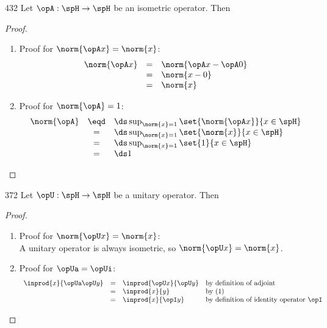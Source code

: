 \begin{theorem}
\citep{michel}{432}
Let $\opA:\spH\to\spH$ be an isometric operator. Then
\end{theorem}
\begin{proof}
\begin{enumerate}
\item Proof for $\norm{\opA x} = \norm{x}$:
\[\begin{array}{rcll}
  \norm{\opA x}
    &=& \norm{\opA x - \opA 0}
  \\&=& \norm{x - 0}
  \\&=& \norm{x}
\end{array}\]

\item Proof for $\norm{\opA} = 1$:
\[\begin{array}{rcll}
  \norm{\opA}
    &\eqd& \ds \sup_{\norm{x}=1}\set{\norm{\opA x}}{x\in\spH}
  \\&=&    \ds \sup_{\norm{x}=1}\set{\norm{x}}{x\in\spH}
  \\&=&    \ds \sup_{\norm{x}=1}\set{1}{x\in\spH}
  \\&=&    \ds 1
\end{array}\]
\end{enumerate}
\end{proof}
\begin{theorem}
\citep{lax}{372}
Let $\opU:\spH\to\spH$ be a unitary operator. Then
\end{theorem}
\begin{proof}
\begin{enumerate}
  \item Proof for $\norm{\opU x}=\norm{x}$: \\
        A unitary operator is always isometric, so $\norm{\opU x}=\norm{x}$.

  \item Proof for $\opUa = \opUi$:
  \[\begin{array}{rcll}
    \inprod{x}{\opUa\opU y}
      &=& \inprod{\opU x}{\opU y}  &\mbox{by definition of adjoint} 
    \\&=& \inprod{x}{y}            &\mbox{by (1)}
    \\&=& \inprod{x}{\opI y}       &\mbox{by definition of identity operator $\opI$}
  \end{array}\]
\end{enumerate}
\end{proof}

